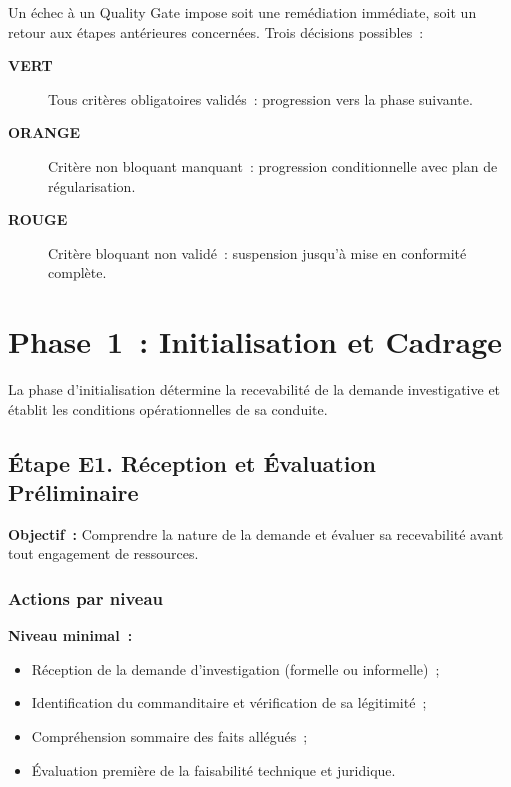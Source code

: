 Un échec à un Quality Gate impose soit une remédiation immédiate, soit un retour
aux étapes antérieures concernées. Trois décisions possibles~:
\begin{description}
    \item[\textcolor{CouleurBordLizbiz}{\textbf{VERT}}] Tous critères obligatoires
          validés~: progression vers la phase suivante.
    \item[\textcolor{CouleurAccent}{\textbf{ORANGE}}] Critère non bloquant
          manquant~: progression conditionnelle avec plan de régularisation.
    \item[\textcolor{CouleurBordAlerte}{\textbf{ROUGE}}] Critère bloquant non
          validé~: suspension jusqu'à mise en conformité complète.
\end{description}

\section{Phase~1~: Initialisation et Cadrage}
\label{sec:piu-phase1}

La phase d'initialisation détermine la recevabilité de la demande investigative
et établit les conditions opérationnelles de sa conduite.

\subsection{Étape E1. Réception et Évaluation Préliminaire}

\textbf{Objectif~:} Comprendre la nature de la demande et évaluer sa recevabilité
avant tout engagement de ressources.

\subsubsection*{Actions par niveau}

\textbf{Niveau minimal~:}
\begin{itemize}
    \item Réception de la demande d'investigation (formelle ou informelle)~;
    \item Identification du commanditaire et vérification de sa légitimité~;
    \item Compréhension sommaire des faits allégués~;
    \item Évaluation première de la faisabilité technique et juridique.
\end{itemize}

